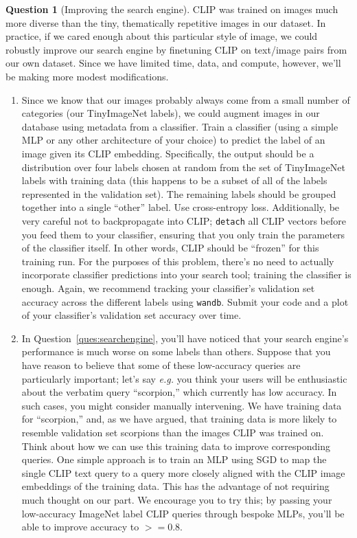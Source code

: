 \documentclass{article}
\theoremstyle{definition}
\newtheorem{subquestion}{Question}[question]
\begin{document}
\begin{subquestion}[Improving the search engine]
 CLIP was trained on images much more diverse than the tiny, thematically repetitive images in our dataset. In practice, if we cared enough about this particular style of image, we could robustly improve our search engine by finetuning CLIP on text/image pairs from our own dataset. Since we have limited time, data, and compute, however, we'll be making more modest modifications.

\begin{enumerate}
    \item Since we know that our images probably always come from a small number of categories (our TinyImageNet labels), we could augment images in our database using metadata from a classifier. Train a classifier (using a simple MLP or any other architecture of your choice) to predict the label of an image given its CLIP embedding. Specifically, the output should be a distribution over four labels chosen at random from the set of TinyImageNet labels with training data (this happens to be a subset of all of the labels represented in the validation set). The remaining labels should be grouped together into a single ``other'' label. Use cross-entropy loss. Additionally, be very careful not to backpropagate into CLIP; \texttt{detach} all CLIP vectors before you feed them to your classifier, ensuring that you only train the parameters of the classifier itself. In other words, CLIP should be ``frozen'' for this training run. For the purposes of this problem, there's no need to actually incorporate classifier predictions into your search tool; training the classifier is enough. Again, we recommend tracking your classifier's validation set accuracy across the different labels using \texttt{wandb}. Submit your code and a plot of your classifier's validation set accuracy over time.
    \item In Question~\ref{ques:searchengine}, you'll have noticed that your search engine's performance is much worse on some labels than others. Suppose that you have reason to believe that some of these low-accuracy queries are particularly important; let's say \textit{e.g.} you think your users will be enthusiastic about the verbatim query ``scorpion,'' which currently has low accuracy. In such cases, you might consider manually intervening. We have training data for ``scorpion,'' and, as we have argued, that training data is more likely to resemble validation set scorpions than the images CLIP was trained on. Think about how we can use this training data to improve corresponding queries. One simple approach is to train an MLP using SGD to map the single CLIP text query to a query more closely aligned with the CLIP image embeddings of the training data. This has the advantage of not requiring much thought on our part. We encourage you to try this; by passing your low-accuracy ImageNet label CLIP queries through bespoke MLPs, you'll be able to improve accuracy to $>= 0.8$. \\
    

\end{enumerate}
\end{subquestion}
\end{document}
